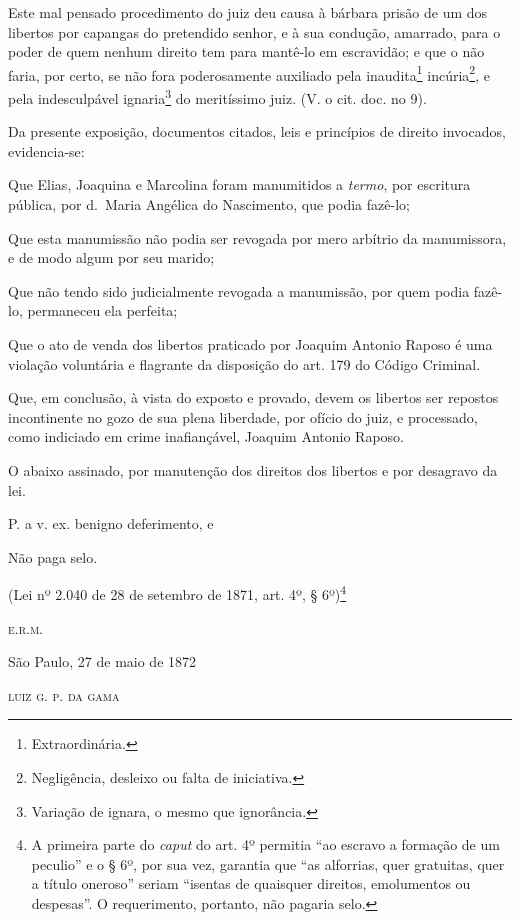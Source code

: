 Este mal pensado procedimento do juiz deu causa à bárbara prisão de um
dos libertos por capangas do pretendido senhor, e à sua condução,
amarrado, para o poder de quem nenhum direito tem para mantê-lo em
escravidão; e que o não faria, por certo, se não fora poderosamente
auxiliado pela inaudita\footnote{ Extraordinária.} incúria\footnote{
  Negligência, desleixo ou falta de iniciativa.}, e pela indesculpável
ignaria\footnote{ Variação de ignara, o mesmo que ignorância.} do
meritíssimo juiz. (V. o cit. doc. no 9).

Da presente exposição, documentos citados, leis e princípios de direito
invocados, evidencia-se:

Que Elias, Joaquina e Marcolina foram manumitidos a \emph{termo}, por
escritura pública, por d.~Maria Angélica do Nascimento, que podia
fazê-lo;

Que esta manumissão não podia ser revogada por mero arbítrio da
manumissora, e de modo algum por seu marido;

Que não tendo sido judicialmente revogada a manumissão, por quem podia
fazê-lo, permaneceu ela perfeita;

Que o ato de venda dos libertos praticado por Joaquim Antonio Raposo é
uma violação voluntária e flagrante da disposição do art. 179 do Código
Criminal.

Que, em conclusão, à vista do exposto e provado, devem os libertos ser
repostos incontinente no gozo de sua plena liberdade, por ofício do
juiz, e processado, como indiciado em crime inafiançável, Joaquim
Antonio Raposo.

O abaixo assinado, por manutenção dos direitos dos libertos e por
desagravo da lei.

P. a v. ex. benigno deferimento, e

Não paga selo.

(Lei nº 2.040 de 28 de setembro de 1871, art. 4º, § 6º)\footnote{ A
  primeira parte do \emph{caput} do art. 4º permitia ``ao escravo a
  formação de um peculio'' e o § 6º, por sua vez, garantia que ``as
  alforrias, quer gratuitas, quer a título oneroso'' seriam ``isentas de
  quaisquer direitos, emolumentos ou despesas''. O requerimento,
  portanto, não pagaria selo.}

\begin{flushright}
\textsc{e.r.m.}

São Paulo, 27 de maio de 1872

\textsc{luiz g. p. da gama}
\end{flushright}

